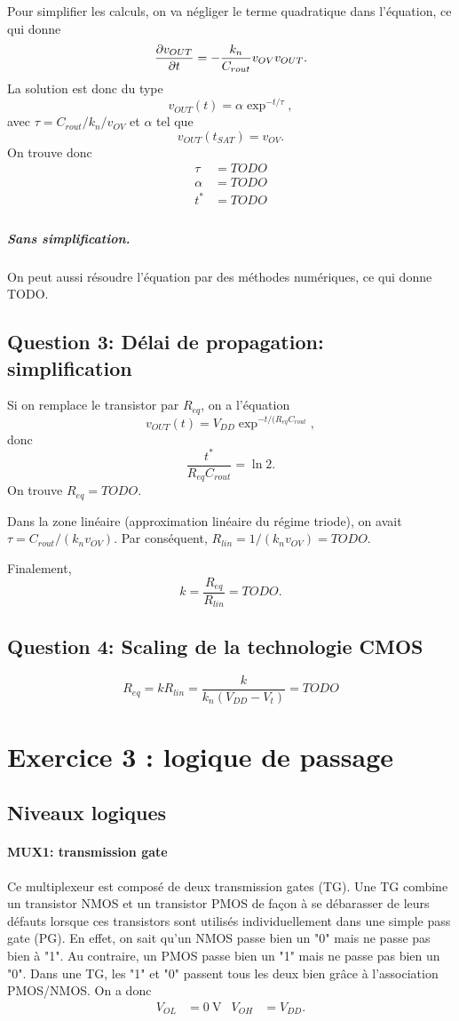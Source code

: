 \documentclass[frenchb,DIV=14]{scrartcl}
\begin{document}
Pour simplifier les calculs, on va négliger le terme quadratique dans
l'équation, ce qui donne
\[\frac{\partial v_{OUT}}{\partial t} = - \frac{k_n}{C_{rout}} v_{OV} v_{OUT}.\]
La solution est donc du type
\[v_{OUT}(t) = \alpha\exp^{-t/\tau},\]
avec $\tau = C_{rout} / k_n / v_{OV}$ et $\alpha$ tel que
\[v_{OUT}(t_{SAT}) =  v_{OV}.\]
On trouve donc
\begin{align*}
    \tau &= TODO \\
    \alpha &= TODO \\
    t^* &= TODO \\
\end{align*}

\subparagraph{Sans simplification.} On peut aussi résoudre l'équation
par des méthodes numériques, ce qui donne TODO.

\subsection*{Question 3: Délai de propagation: simplification}

Si on remplace le transistor par $R_{eq}$, on a l'équation
\[v_{OUT}(t) = V_{DD} \exp^{-t/(R_{eq}C_{rout}},\]
donc \[\frac{t^*}{R_{eq}C_{rout}} = \ln 2.\]
On trouve $R_{eq} = TODO$.

Dans la zone linéaire (approximation linéaire du régime triode),
on avait $\tau = C_{rout} / (k_n v_{OV})$. Par conséquent,
$R_{lin} = 1 / (k_n v_{OV}) = TODO$.

Finalement,
\[k = \frac{R_{eq}}{R_{lin}} = TODO.\]

\subsection*{Question 4: Scaling de la technologie CMOS}

\[R_{eq} = k R_{lin} = \frac{k}{k_n (V_{DD} - V_t)} = TODO\]

\section*{Exercice 3 : logique de passage}
\subsection*{Niveaux logiques}
\paragraph{MUX1: transmission gate} 
Ce multiplexeur est composé de deux transmission gates (TG).
Une TG combine un transistor NMOS et un transistor PMOS de façon à se débarasser
de leurs défauts lorsque ces transistors sont utilisés individuellement dans une
simple pass gate (PG). En effet, on sait qu'un NMOS passe bien un "0" mais ne passe
pas bien à "1". Au contraire, un PMOS passe bien un "1" mais ne passe pas bien un "0".
Dans une TG, les "1" et "0" passent tous les deux bien grâce à l'association PMOS/NMOS.
On a donc
\begin{align*}
	V_{OL} &= \SI{0}{\volt} & V_{OH} &= V_{DD}.
\end{align*}
\end{document}
